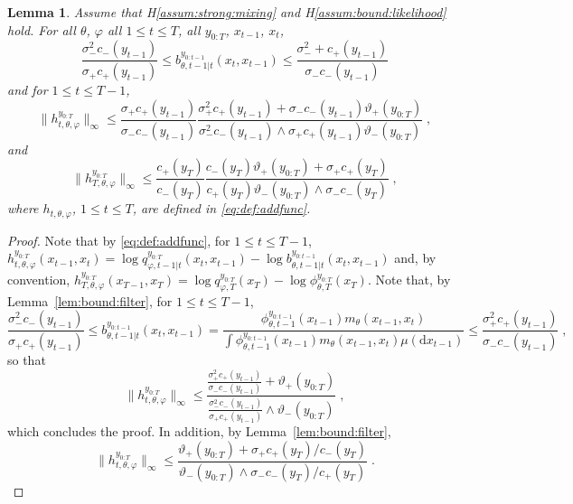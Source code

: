 \documentclass{article}
\newtheorem{lemma}[theorem]{Lemma}
\newcommand{\udlow}{\sigma_-}
\newcommand{\udup}{\sigma_+}
\newcommand{\udlowvar}{\vartheta_-}
\newcommand{\udupvar}{\vartheta_+}
\newcommand{\1}{\mathbbm{1}}
\newcommand{\rmd}{\ensuremath{\mathrm{d}}}
\newcommand{\eqsp}{\;}
\begin{document}
\begin{lemma}
\label{lem:bound:addfunc}
Assume that H\ref{assum:strong:mixing} and H\ref{assum:bound:likelihood} hold. For all $\theta$, $\varphi$  all $1\leq t\leq T$, all $y_{0:T}$, $x_{t-1}$, $x_t$,
$$
\frac{\sigma^2_-c_-(y_{t-1})}{\sigma_+c_+(y_{t-1})}\leq b^{y_{0:t-1}}_{\theta,t-1|t}(x_t,x_{t-1}) \leq \frac{\sigma^2_-+c_+(y_{t-1})}{\sigma_-c_-(y_{t-1})}
$$
and for $1\leq t \leq T-1$,
$$
\|h^{y_{0:T}}_{t,\theta,\varphi}\|_\infty \leq \frac{\sigma_+c_+(y_{t-1})}{\sigma_-c_-(y_{t-1})}\frac{\sigma^2_+c_+(y_{t-1})+\sigma_-c_-(y_{t-1})\udupvar(y_{0:T})}{ \sigma^2_-c_-(y_{t-1}) \wedge \sigma_+c_+(y_{t-1})\udlowvar(y_{0:T})}\eqsp,
$$
and 
$$
\|h^{y_{0:T}}_{T,\theta,\varphi}\|_\infty \leq \frac{c_+(y_T)}{c_-(y_T)}\frac{c_-(y_T)\udupvar(y_{0:T}) +  \udup c_+(y_T)}{c_+(y_T)\udlowvar(y_{0:T})\wedge \udlow c_-(y_T)}\eqsp,
$$
where $h_{t,\theta,\varphi}$, $1\leq t\leq T$,  are defined in \eqref{eq:def:addfunc}.
\end{lemma}
\begin{proof}
Note that by \eqref{eq:def:addfunc}, for $1\leq t \leq T-1$,  $h^{y_{0:T}}_{t,\theta,\varphi}(x_{t-1},x_t) = \log q^{y_{0:T}}_{\varphi,t-1|t}(x_t,x_{t-1}) - \log b^{y_{0:t-1}}_{\theta,t-1|t}(x_t,x_{t-1})$ and, by convention,  $h^{y_{0:T}}_{T,\theta,\varphi}(x_{T-1},x_T) = \log q^{y_{0:T}}_{\varphi,T}(x_T) - \log \phi^{y_{0:T}}_{\theta,T}(x_T)$. Note that, by Lemma~\ref{lem:bound:filter}, for $1\leq t\leq T-1$,
$$
\frac{\sigma^2_-c_-(y_{t-1})}{\sigma_+c_+(y_{t-1})}\leq b^{y_{0:t-1}}_{\theta,t-1|t}(x_t,x_{t-1}) = \frac{\phi_{\theta,t-1}^{y_{0:t-1}}(x_{t-1})m_\theta(x_{t-1},x_t)}{\int \phi_{\theta,t-1}^{y_{0:t-1}}(x_{t-1})m_\theta(x_{t-1},x_t)\mu(\rmd x_{t-1})}\leq \frac{\sigma^2_+c_+(y_{t-1})}{\sigma_-c_-(y_{t-1})}\eqsp,
$$
so that
$$
\|h^{y_{0:T}}_{t,\theta,\varphi}\|_\infty \leq \frac{\frac{\sigma^2_+c_+(y_{t-1})}{\sigma_-c_-(y_{t-1})}+\udupvar(y_{0:T})}{ \frac{\sigma^2_-c_-(y_{t-1})}{\sigma_+c_+(y_{t-1})} \wedge \udlowvar(y_{0:T})}\eqsp,
$$
which concludes the proof. In addition, by Lemma~\ref{lem:bound:filter},
$$
\|h^{y_{0:T}}_{t,\theta,\varphi}\|_\infty \leq \frac{\udupvar(y_{0:T}) +  \udup c_+(y_T)/c_-(y_T)}{\udlowvar(y_{0:T})\wedge \udlow c_-(y_T)/c_+(y_T)}\eqsp.
$$

\end{proof}
\end{document}
